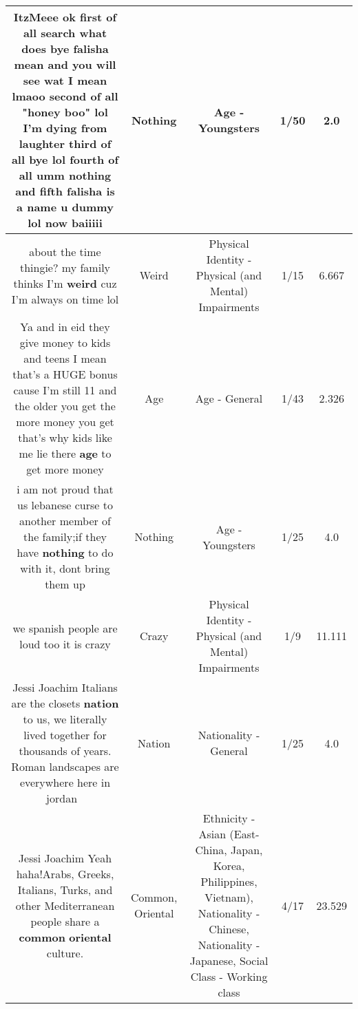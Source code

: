 \documentclass[11pt]{article}
\newlength\mylength
\begin{document}
\begin{center}
\begin{longtable}{|C{.65\mylength}|C{.30\mylength}|C{.12\mylength}|C{.12\mylength}|C{.12\mylength}|}
  \small ItzMeee ok first of all search what does bye falisha mean and you will see wat I mean lmaoo second of all "honey boo" lol I'm dying from laughter third of all bye lol fourth of all umm \textbf{nothing} and fifth falisha is a name u dummy lol now baiiiii\normalsize   & Nothing & Age - Youngsters & 1/50 & 2.0 \\  \hline
  \small about the time thingie? my family thinks I'm \textbf{weird} cuz I'm always on time lol\normalsize   & Weird & Physical Identity - Physical (and Mental) Impairments & 1/15 & 6.667 \\  \hline
  \small Ya and in eid they give money to kids and teens I mean that's a HUGE bonus cause I'm still 11 and the older you get the more money you get that's why kids like me lie there \textbf{age} to get more money\normalsize   & Age & Age - General & 1/43 & 2.326 \\  \hline
  \small i am not proud that us lebanese curse to another member of the family;if they have \textbf{nothing} to do with it, dont bring them up\normalsize   & Nothing & Age - Youngsters & 1/25 & 4.0 \\  \hline
  \small we spanish people are loud too it is crazy\normalsize   & Crazy & Physical Identity - Physical (and Mental) Impairments & 1/9 & 11.111 \\  \hline
  \small Jessi Joachim Italians are the closets \textbf{nation} to us, we literally lived together for thousands of years. Roman landscapes are everywhere here in jordan 🤗\normalsize   & Nation & Nationality - General & 1/25 & 4.0 \\  \hline
  \small Jessi Joachim Yeah haha!Arabs, Greeks, Italians, Turks, and other Mediterranean people share a \textbf{common} \textbf{o\textbf{r\textbf{iental}}} culture.\normalsize   & Common, Oriental & Ethnicity - Asian (East- China, Japan, Korea, Philippines, Vietnam), Nationality - Chinese, Nationality - Japanese, Social Class - Working class & 4/17 & 23.529 \\  \hline

\end{longtable}
\end{center}
\end{document}
